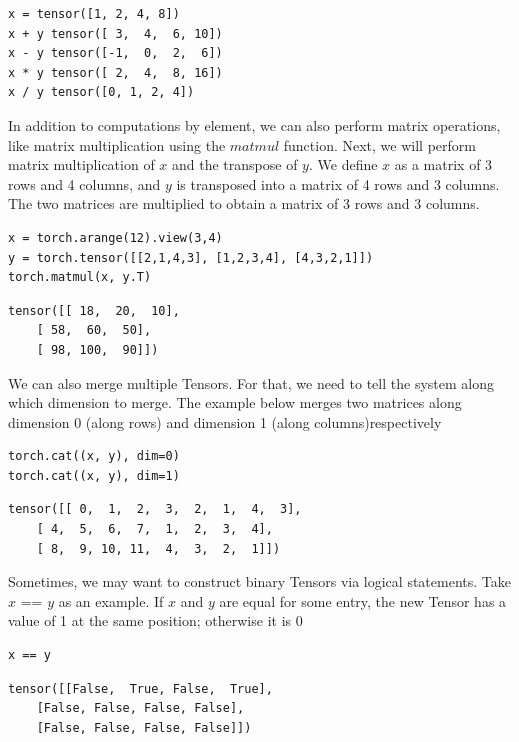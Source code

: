 \documentclass[]{article}
\begin{document}
\begin{verbatim}
x = tensor([1, 2, 4, 8])
x + y tensor([ 3,  4,  6, 10])
x - y tensor([-1,  0,  2,  6])
x * y tensor([ 2,  4,  8, 16])
x / y tensor([0, 1, 2, 4])
\end{verbatim}

In addition to computations by element, we can also perform matrix operations, like matrix multiplication using the $ matmul $ function. Next, we will perform matrix multiplication of $ x $ and the transpose of $ y $. We define $ x $ as a matrix of 3 rows and 4 columns, and $ y $ is transposed into a matrix of 4 rows and 3 columns. The two matrices are multiplied to obtain a matrix of 3 rows and 3 columns.

\begin{verbatim}
x = torch.arange(12).view(3,4)
y = torch.tensor([[2,1,4,3], [1,2,3,4], [4,3,2,1]])
torch.matmul(x, y.T) 
\end{verbatim}

\begin{verbatim}
tensor([[ 18,  20,  10],
	[ 58,  60,  50],
	[ 98, 100,  90]])
\end{verbatim}

We can also merge multiple Tensors. For that, we need to tell the system along which dimension to merge. The example below merges two matrices along dimension 0 (along rows) and dimension 1 (along columns)respectively

\begin{verbatim}
torch.cat((x, y), dim=0)
torch.cat((x, y), dim=1)
\end{verbatim}

\begin{verbatim}
tensor([[ 0,  1,  2,  3,  2,  1,  4,  3],
	[ 4,  5,  6,  7,  1,  2,  3,  4],
	[ 8,  9, 10, 11,  4,  3,  2,  1]])
\end{verbatim}

Sometimes, we may want to construct binary Tensors via logical statements. Take $ x $ == $ y $ as an example. If $ x $ and $ y $ are equal for some entry, the new Tensor has a value of 1 at the same position; otherwise it is 0

\begin{verbatim}
x == y
\end{verbatim}

\begin{verbatim}
tensor([[False,  True, False,  True],
	[False, False, False, False],
	[False, False, False, False]])
\end{verbatim}
\end{document}
